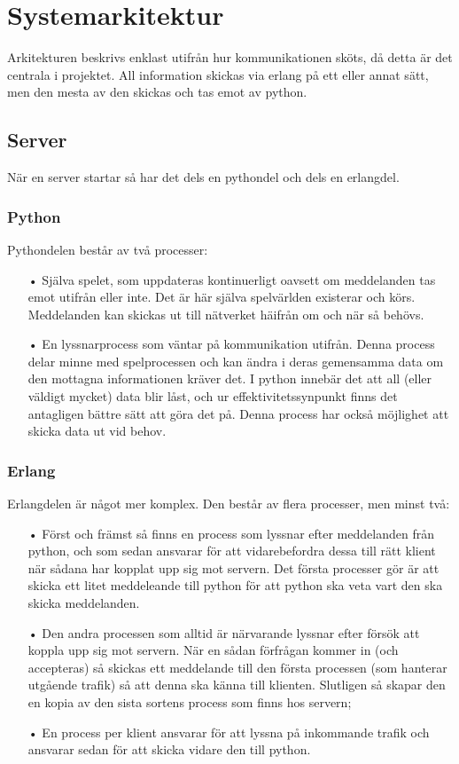 \documentclass{scrartcl}
\begin{document}
\medskip
\section{Systemarkitektur}

Arkitekturen beskrivs enklast utifrån hur kommunikationen sköts, då detta är det centrala i projektet. All information skickas via erlang på ett eller annat sätt, men den mesta av den skickas och tas emot av python.
\smallskip
\subsection{Server}
När en server startar så har det dels en pythondel och dels en erlangdel. 

\subsubsection{Python}
Pythondelen består av två processer:
\begin{enumerate}
\item[•] Själva spelet, som uppdateras kontinuerligt oavsett om meddelanden tas emot utifrån eller inte. Det är här själva spelvärlden existerar och körs. Meddelanden kan skickas ut till nätverket häifrån om och när så behövs.
\smallskip
\item[•] En lyssnarprocess som väntar på kommunikation utifrån. Denna process delar minne med spelprocessen och kan ändra i deras gemensamma data om den mottagna informationen kräver det. I python innebär det att all (eller väldigt mycket) data blir låst, och ur effektivitetssynpunkt finns det antagligen bättre sätt att göra det på. Denna process har också möjlighet att skicka data ut vid behov.
\end{enumerate}
\smallskip

\subsubsection{Erlang}
Erlangdelen är något mer komplex. Den består av flera processer, men minst två:
\begin{enumerate}
\item[•] Först och främst så finns en process som lyssnar efter meddelanden från python, och som sedan ansvarar för att vidarebefordra dessa till rätt klient när sådana har kopplat upp sig mot servern. Det första processer gör är att skicka ett litet meddeleande till python för att python ska veta vart den ska skicka meddelanden.
\smallskip
\item[•] Den andra processen som alltid är närvarande lyssnar efter försök att koppla upp sig mot servern. När en sådan förfrågan kommer in (och accepteras) så skickas ett meddelande till den första processen (som hanterar utgående trafik) så att denna ska känna till klienten. Slutligen så skapar den en kopia av den sista sortens process som finns hos servern;
\smallskip
\item[•] En process per klient ansvarar för att lyssna på inkommande trafik och ansvarar sedan för att skicka vidare den till python.
\end{enumerate}
\smallskip
\end{document}
